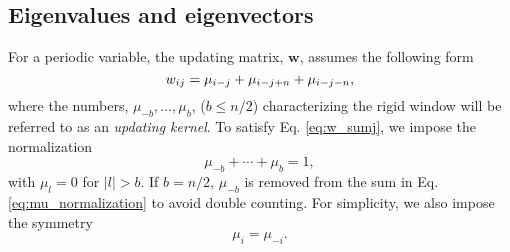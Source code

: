 \documentclass[reprint, superscriptaddress, floatfix]{revtex4-1}
\begin{document}
\subsection{\label{sec:wband_eig}
Eigenvalues and eigenvectors}







For a periodic variable\cite{dama2014},
the updating matrix, $\mathbf w$,
assumes the following form
%
\begin{equation}
  w_{ij}
  =
  \mu_{i-j}
  +
  \mu_{i-j+n}
  +
  \mu_{i-j-n}
  ,
\notag
\end{equation}
%
where the numbers,
$\mu_{-b}, \dots, \mu_b$, ($b \le n/2$)
characterizing the rigid window
will be referred to as an \emph{updating kernel}\cite{bussi2006}.
%
To satisfy Eq. \eqref{eq:w_sumj},
we impose the normalization
%
\begin{equation}
  \mu_{-b} + \cdots + \mu_b = 1
  ,
\label{eq:mu_normalization}
\end{equation}
%
with $\mu_l = 0$ for $|l| > b$.
%
If $b = n/2$, $\mu_{-b}$ is removed
from the sum in Eq. \eqref{eq:mu_normalization}
to avoid double counting.
%
For simplicity, we also impose the symmetry
%
\begin{equation}
  \mu_i = \mu_{-i}
  .
\label{eq:mu_symm}
\end{equation}
\end{document}
